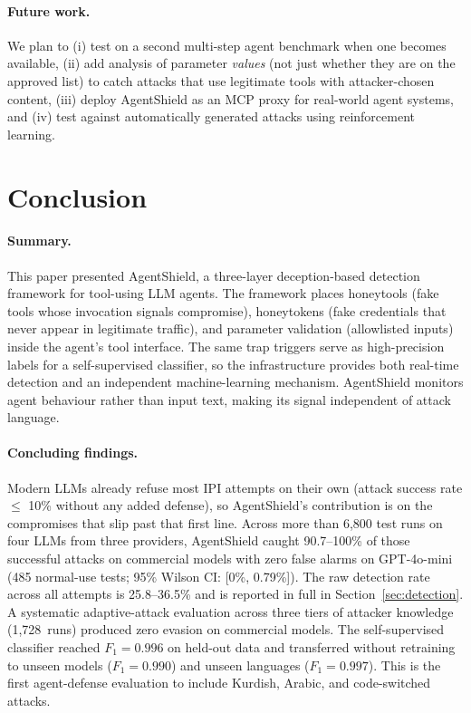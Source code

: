 \documentclass[preprint,12pt]{elsarticle}
\begin{document}
\paragraph{Future work.}
We plan to (i) test on a second multi-step agent benchmark when one becomes available, (ii) add analysis of parameter \emph{values} (not just whether they are on the approved list) to catch attacks that use legitimate tools with attacker-chosen content, (iii) deploy AgentShield as an MCP proxy for real-world agent systems, and (iv) test against automatically generated attacks using reinforcement learning.


\section{Conclusion}
\label{sec:conclusion}

\paragraph{Summary.}
This paper presented AgentShield, a three-layer deception-based detection framework for tool-using LLM agents. The framework places honeytools (fake tools whose invocation signals compromise), honeytokens (fake credentials that never appear in legitimate traffic), and parameter validation (allowlisted inputs) inside the agent's tool interface. The same trap triggers serve as high-precision labels for a self-supervised classifier, so the infrastructure provides both real-time detection and an independent machine-learning mechanism. AgentShield monitors agent behaviour rather than input text, making its signal independent of attack language.

\paragraph{Concluding findings.}
Modern LLMs already refuse most IPI attempts on their own (attack success rate $\leq$ 10\% without any added defense), so AgentShield's contribution is on the compromises that slip past that first line. Across more than 6{,}800 test runs on four LLMs from three providers, AgentShield caught 90.7--100\% of those successful attacks on commercial models with zero false alarms on GPT-4o-mini (485 normal-use tests; 95\% Wilson CI: [0\%, 0.79\%]). The raw detection rate across all attempts is 25.8--36.5\% and is reported in full in Section~\ref{sec:detection}. A systematic adaptive-attack evaluation across three tiers of attacker knowledge (1{,}728~runs) produced zero evasion on commercial models. The self-supervised classifier reached $F_1 = 0.996$ on held-out data and transferred without retraining to unseen models ($F_1 = 0.990$) and unseen languages ($F_1 = 0.997$). This is the first agent-defense evaluation to include Kurdish, Arabic, and code-switched attacks.
\end{document}
